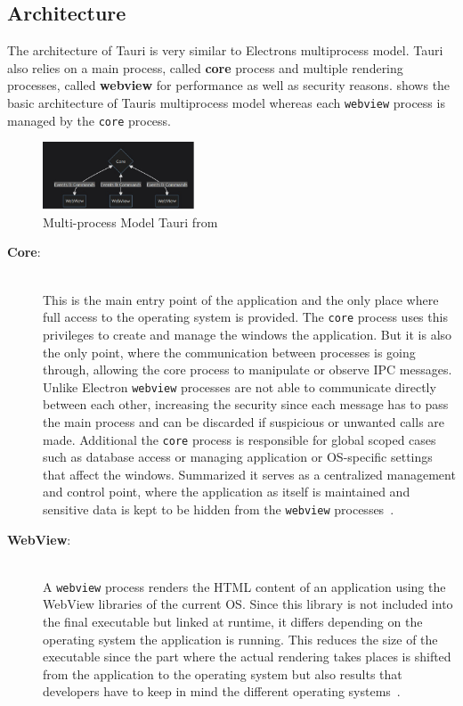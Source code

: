 \subsection{Architecture}
\label{subsec:tauri:architecture}
The architecture of Tauri is very similar to Electrons multiprocess model.
Tauri also relies on a main process, called \textbf{core} process and multiple rendering processes, called \textbf{webview} for performance as well as security reasons.
 shows the basic architecture of Tauris multiprocess model whereas each \texttt{webview} process is managed by the \texttt{core} process.
\begin{figure}[ht]
    \centering
    \includegraphics[width=0.4\textwidth]{images/TauriArchitecture}
    \caption{Multi-process Model Tauri from~\cite{tauri}}
    \label{fig:tauri:model}
\end{figure}

\begin{description}
    \item[\textbf{Core}:] \hfill \\ This is the main entry point of the application and the only place where full access to the operating system is provided.
    The \texttt{core} process uses this privileges to create and manage the windows the application.
    But it is also the only point, where the communication between processes is going through, allowing the core process to manipulate or observe \ac{IPC} messages.
    Unlike Electron \texttt{webview} processes are not able to communicate directly between each other, increasing the security since each message has to pass the main process and
    can be discarded if suspicious or unwanted calls are made.
    Additional the \texttt{core} process is responsible for global scoped cases such as database access or managing application or \ac{OS}-specific settings that affect the windows.
    Summarized it serves as a centralized management and control point, where the application as itself is maintained and sensitive data is kept to be hidden from the \texttt{webview} processes~\cite{tauri}.


    \item[\textbf{WebView}:] \hfill \\ A \texttt{webview} process renders the \ac{HTML} content of an application using the WebView libraries of the current \ac{OS}.
    Since this library is not included into the final executable but linked at runtime, it differs depending on the operating system the application is running.
    This reduces the size of the executable since the part where the actual rendering takes places is shifted from the application to the operating system but also results
    that developers have to keep in mind the different operating systems~\cite{tauri}.

\end{description}

